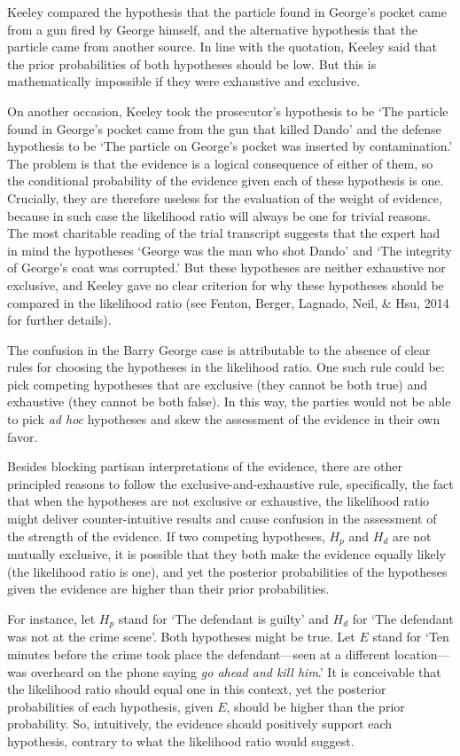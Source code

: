 \documentclass[
  10pt,
  dvipsnames,enabledeprecatedfontcommands]{scrartcl}
\begin{document}
\noindent  Keeley compared the hypothesis that the particle found in
George's pocket came from a gun fired by George himself, and the
alternative hypothesis that the particle came from another source. In
line with the quotation, Keeley said that the prior probabilities of
both hypotheses should be low. But this is mathematically impossible if
they were exhaustive and exclusive.

On another occasion, Keeley took the prosecutor's hypothesis to be `The
particle found in George's pocket came from the gun that killed Dando'
and the defense hypothesis to be `The particle on George's pocket was
inserted by contamination.' The problem is that the evidence is a
logical consequence of either of them, so the conditional probability of
the evidence given each of these hypothesis is one. Crucially, they are
therefore useless for the evaluation of the weight of evidence, because
in such case the likelihood ratio will always be one for trivial
reasons. The most charitable reading of the trial transcript suggests
that the expert had in mind the hypotheses `George was the man who shot
Dando' and `The integrity of George's coat was corrupted.' But these
hypotheses are neither exhaustive nor exclusive, and Keeley gave no
clear criterion for why these hypotheses should be compared in the
likelihood ratio (see Fenton, Berger, Lagnado, Neil, \& Hsu, 2014 for
further details).

The confusion in the Barry George case is attributable to the absence of
clear rules for choosing the hypotheses in the likelihood ratio. One
such rule could be: pick competing hypotheses that are exclusive (they
cannot be both true) and exhaustive (they cannot be both false). In this
way, the parties would not be able to pick \textit{ad hoc} hypotheses
and skew the assessment of the evidence in their own favor.

Besides blocking partisan interpretations of the evidence, there are
other principled reasons to follow the exclusive-and-exhaustive rule,
specifically, the fact that when the hypotheses are not exclusive or
exhaustive, the likelihood ratio might deliver counter-intuitive results
and cause confusion in the assessment of the strength of the evidence.
If two competing hypotheses, \(H_p\) and \(H_d\) are not mutually
exclusive, it is possible that they both make the evidence equally
likely (the likelihood ratio is one), and yet the posterior
probabilities of the hypotheses given the evidence are higher than their
prior probabilities.

For instance, let \(H_p\) stand for `The defendant is guilty' and
\(H_d\) for `The defendant was not at the crime scene'. Both hypotheses
might be true. Let \(E\) stand for `Ten minutes before the crime took
place the defendant---seen at a different location--- was overheard on
the phone saying \emph{go ahead and kill him}.' It is conceivable that
the likelihood ratio should equal one in this context, yet the posterior
probabilities of each hypothesis, given \(E\), should be higher than the
prior probability. So, intuitively, the evidence should positively
support each hypothesis, contrary to what the likelihood ratio would
suggest.
\end{document}
